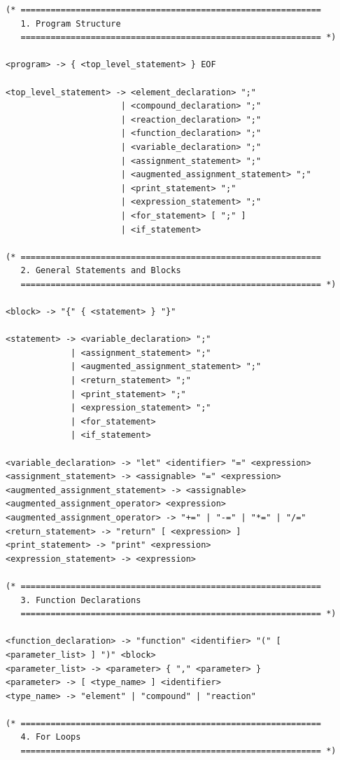 \documentclass[11pt,a4paper]{article}
\begin{document}
\begin{lstlisting}[style=ebnf]
(* ============================================================
   1. Program Structure
   ============================================================ *)

<program> -> { <top_level_statement> } EOF

<top_level_statement> -> <element_declaration> ";"
                       | <compound_declaration> ";"
                       | <reaction_declaration> ";"
                       | <function_declaration> ";"
                       | <variable_declaration> ";"
                       | <assignment_statement> ";"
                       | <augmented_assignment_statement> ";"
                       | <print_statement> ";"
                       | <expression_statement> ";"
                       | <for_statement> [ ";" ]
                       | <if_statement>

(* ============================================================
   2. General Statements and Blocks
   ============================================================ *)

<block> -> "{" { <statement> } "}"

<statement> -> <variable_declaration> ";"
             | <assignment_statement> ";"
             | <augmented_assignment_statement> ";"
             | <return_statement> ";"
             | <print_statement> ";"
             | <expression_statement> ";"
             | <for_statement>
             | <if_statement>

<variable_declaration> -> "let" <identifier> "=" <expression>
<assignment_statement> -> <assignable> "=" <expression>
<augmented_assignment_statement> -> <assignable> <augmented_assignment_operator> <expression>
<augmented_assignment_operator> -> "+=" | "-=" | "*=" | "/="
<return_statement> -> "return" [ <expression> ]
<print_statement> -> "print" <expression>
<expression_statement> -> <expression>

(* ============================================================
   3. Function Declarations
   ============================================================ *)

<function_declaration> -> "function" <identifier> "(" [ <parameter_list> ] ")" <block>
<parameter_list> -> <parameter> { "," <parameter> }
<parameter> -> [ <type_name> ] <identifier>
<type_name> -> "element" | "compound" | "reaction"

(* ============================================================
   4. For Loops
   ============================================================ *)


\end{lstlisting}
\end{document}
